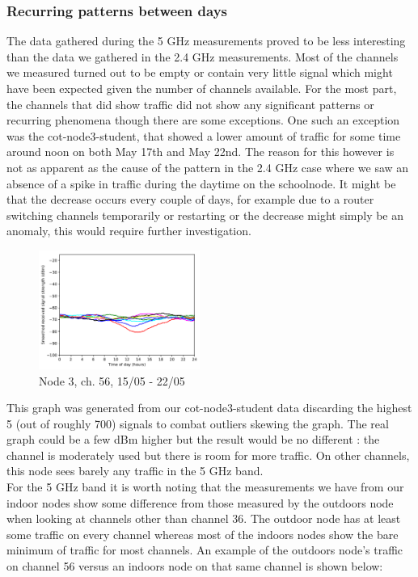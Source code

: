 \documentclass[a4paper, 11pt]{article}
\begin{document}
\subsubsection{Recurring patterns between days}
The data gathered during the 5 GHz measurements proved to be less interesting than the data we gathered in the 2.4 GHz measurements. Most of the channels we measured turned out to be empty or contain very little signal which might have been expected given the number of channels available. For the most part, the channels that did show traffic did not show any significant patterns or recurring phenomena though there are some exceptions. One such an exception was the cot-node3-student, that showed a lower amount of traffic for some time around noon on both May 17th and May 22nd. The reason for this however is not as apparent as the cause of the pattern in the 2.4 GHz case where we saw an absence of a spike in traffic during the daytime on the schoolnode. It might be that the decrease occurs every couple of days, for example due to a router switching channels temporarily or restarting or the decrease might simply be an anomaly, this would require further investigation.
\begin{figure}[ht]
\centering
\includegraphics[width=0.47\textwidth]{images/5_GHz/cot-node3-student_2017-05-22_chan36_image.pdf}
\caption{Node 3, ch. 56, 15/05 - 22/05}
\label{cot3_5ghz_pattern_chan36}
\end{figure}
This graph was generated from our cot-node3-student data discarding the highest 5 (out of roughly 700) signals to combat outliers skewing the graph. The real graph could be a few dBm higher but the result would be no different : the channel is moderately used but there is room for more traffic. On other channels, this node sees barely any traffic in the 5 GHz band. \\
For the 5 GHz band it is worth noting that the measurements we have from our indoor nodes show some difference from those measured by the outdoors node when looking at channels other than channel 36. The outdoor node has at least some traffic on every channel whereas most of the indoors nodes show the bare minimum of traffic for most channels. An example of the outdoors node's traffic on channel 56 versus an indoors node on that same channel is shown below:
\end{document}
